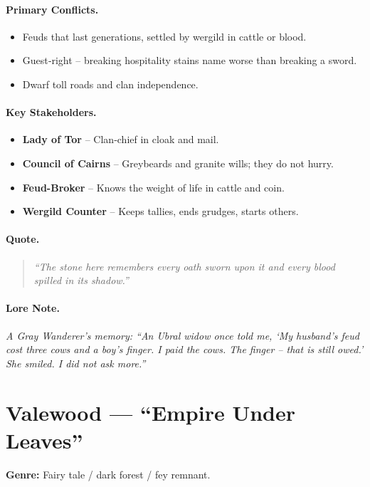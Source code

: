 \paragraph{Primary Conflicts.}
\begin{itemize}
  \item Feuds that last generations, settled by wergild in cattle or blood.
  \item Guest‑right – breaking hospitality stains name worse than breaking a sword.
  \item Dwarf toll roads and clan independence.
\end{itemize}

\paragraph{Key Stakeholders.}
\begin{itemize}
  \item \textbf{Lady of Tor} – Clan‑chief in cloak and mail.
  \item \textbf{Council of Cairns} – Greybeards and granite wills; they do not hurry.
  \item \textbf{Feud-Broker} – Knows the weight of life in cattle and coin.
  \item \textbf{Wergild Counter} – Keeps tallies, ends grudges, starts others.
\end{itemize}

\paragraph{Quote.}
\begin{quote}
\emph{“The stone here remembers every oath sworn upon it and every blood spilled in its shadow.”}
\end{quote}

\paragraph{Lore Note.}
\emph{A Gray Wanderer’s memory: “An Ubral widow once told me, ‘My husband’s feud cost three cows and a boy’s finger. I paid the cows. The finger – that is still owed.’ She smiled. I did not ask more.”}

\section{Valewood — “Empire Under Leaves”}
\textbf{Genre:} Fairy tale / dark forest / fey remnant.

